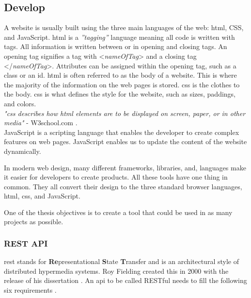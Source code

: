 \subsection{Develop}%
\label{sub:Develop}

A website is usually built using the three main languages of the web: \acrfull{html}, CSS, and JavaScript. \acrshort{html} is a \textit{''tagging''} language meaning all code is written with tags. All information is written between or in opening and closing tags. An opening tag signifies a tag with  <\textit{nameOfTag}> and a closing tag </\textit{nameOfTag}>. Attributes can be assigned within the opening tag, such as a class or an id.  
\acrshort{html} is often referred to as the body of a website. This is where the majority of the information on the web pages is stored. \acrshort{css} is the clothes to the body. \acrshort{css} is what defines the style for the website, such as sizes, paddings, and colors.\\
\textit{"\acrshort{css} describes how \acrshort{html} elements are to be displayed on screen, paper, or in other media"} - W3school.com \cite{CSSIntroduction}.\\
JavaScript is a scripting language that enables the developer to create complex features on web pages. JavaScript enables us to update the content of the website dynamically. 

In modern web design, many different frameworks, libraries, and, languages make it easier for developers to create products.  All these tools have one thing in common. They all convert their design to the three standard browser languages, \acrshort{html}, \acrshort{css}, and JavaScript. 

One of the thesis objectives is to create a tool that could be used in as many projects as possible.  


\subsubsection{REST API}%
\label{sub:REST API}
\gls{rest} stands for \textbf{Re}presentational \textbf{S}tate \textbf{T}ransfer and is an architectural style of distributed hypermedia systems. Roy Fielding created this in 2000 with the release of his dissertation \cite{fieldingFieldingDissertationCHAPTER}. An \acrshort{api} to be called RESTful needs to fill the following six requirements \cite{fieldingFieldingDissertationCHAPTER,restfulapi.netWhatREST}. 

